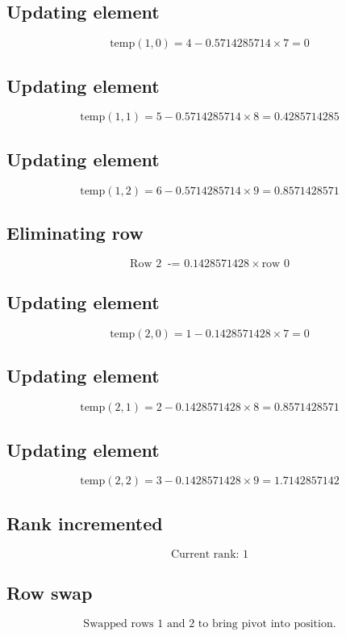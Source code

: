 \documentclass{article}
\begin{document}
\subsection*{ \vspace{1em} Updating element}
\[
\text{temp}( 1,0 ) = 4 - 0.5714285714 \times 7 = 0
\]
\subsection*{ \vspace{1em} Updating element}
\[
\text{temp}( 1,1 ) = 5 - 0.5714285714 \times 8 = 0.4285714285
\]
\subsection*{ \vspace{1em} Updating element}
\[
\text{temp}( 1,2 ) = 6 - 0.5714285714 \times 9 = 0.8571428571
\]
\subsection*{ \vspace{1em} Eliminating row}
\[
\text{Row } 2\ \text{ -= } 0.1428571428 \times \text{row } 0
\]
\subsection*{ \vspace{1em} Updating element}
\[
\text{temp}( 2,0 ) = 1 - 0.1428571428 \times 7 = 0
\]
\subsection*{ \vspace{1em} Updating element}
\[
\text{temp}( 2,1 ) = 2 - 0.1428571428 \times 8 = 0.8571428571
\]
\subsection*{ \vspace{1em} Updating element}
\[
\text{temp}( 2,2 ) = 3 - 0.1428571428 \times 9 = 1.7142857142
\]
\subsection*{ \vspace{1em} Rank incremented}
\[
\text{Current rank: } 1
\]
\subsection*{ \vspace{1em} Row swap}
\[
\text{Swapped rows } 1 \text{ and } 2 \text{ to bring pivot into position.}
\]
\end{document}
